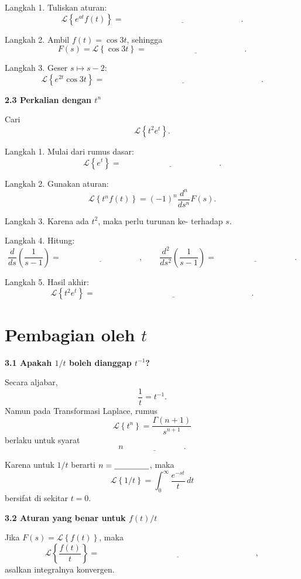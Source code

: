 \documentclass[11pt,a4paper]{article}
\newcommand{\Lcal}{\mathcal{L}}
\newcommand{\Lap}[1]{\Lcal\left\{#1\right\}}
\newcommand{\stepbox}[1]{\vspace{0.2cm}\colorbox{iteraLight}{\parbox{0.98\linewidth}{\textbf{#1}}}\vspace{0.15cm}}
\begin{document}
Langkah 1. Tuliskan aturan:
\[
\Lap{e^{at}f(t)}=\underline{\hspace{6cm}}.
\]

Langkah 2. Ambil $f(t)=\cos 3t$, sehingga
\[
F(s)=\Lap{\cos 3t}=\underline{\hspace{5cm}}.
\]

Langkah 3. Geser $s\mapsto s-2$:
\[
\Lap{e^{2t}\cos 3t}
=
\underline{\hspace{8cm}}.
\]

\stepbox{2.3 Perkalian dengan $t^n$}

Cari
\[
\Lap{t^2e^t}.
\]

Langkah 1. Mulai dari rumus dasar:
\[
\Lap{e^t}=\underline{\hspace{5cm}}.
\]

Langkah 2. Gunakan aturan:
\[
\Lap{t^n f(t)}
=
(-1)^n\frac{d^n}{ds^n}F(s).
\]

Langkah 3. Karena ada $t^2$, maka perlu turunan ke-\underline{\hspace{1cm}} terhadap $s$.

Langkah 4. Hitung:
\[
\frac{d}{ds}\left(\frac{1}{s-1}\right)=\underline{\hspace{4cm}},
\qquad
\frac{d^2}{ds^2}\left(\frac{1}{s-1}\right)=\underline{\hspace{4cm}}.
\]

Langkah 5. Hasil akhir:
\[
\Lap{t^2e^t}=\underline{\hspace{8cm}}.
\]

\section{Pembagian oleh $t$}
\stepbox{3.1 Apakah $1/t$ boleh dianggap $t^{-1}$?}

Secara aljabar,
\[
\frac{1}{t}=t^{-1}.
\]
Namun pada Transformasi Laplace, rumus
\[
\Lap{t^n}=\frac{\Gamma(n+1)}{s^{n+1}}
\]
berlaku untuk syarat
\[
n\ \underline{\hspace{3cm}}.
\]

Karena untuk $1/t$ berarti $n=\underline{\hspace{1.5cm}}$, maka
\[
\Lap{1/t}=\int_0^\infty \frac{e^{-st}}{t}\,dt
\]
bersifat \underline{\hspace{5cm}} di sekitar $t=0$.

\stepbox{3.2 Aturan yang benar untuk $f(t)/t$}

Jika $F(s)=\Lap{f(t)}$, maka
\[
\Lap{\frac{f(t)}{t}}
=
\underline{\hspace{8cm}},
\]
asalkan integralnya konvergen.
\end{document}
